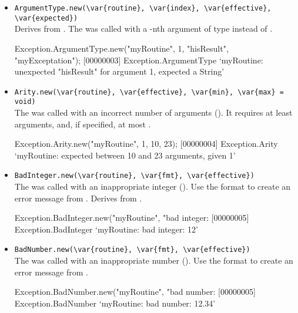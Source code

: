 \begin{itemize}
\item \lstinline|ArgumentType.new(\var{routine}, \var{index}, \var{effective}, \var{expected})|\\
  Derives from .  The  was
  called with a -nth argument of type 
  instead of .
\begin{urbiscript}
Exception.ArgumentType.new("myRoutine", 1, "hisResult", "myExceptation");
[00000003] Exception.ArgumentType `myRoutine: unexpected "hisResult" for argument 1, expected a String'
\end{urbiscript}

\item \lstinline|Arity.new(\var{routine}, \var{effective}, \var{min}, \var{max} = void)|\\
  The  was called with an incorrect number of arguments
  ().  It requires at least  arguments, and,
  if specified, at most .
\begin{urbiscript}
Exception.Arity.new("myRoutine", 1, 10, 23);
[00000004] Exception.Arity `myRoutine: expected between 10 and 23 arguments, given 1'
\end{urbiscript}

\item \lstinline|BadInteger.new(\var{routine}, \var{fmt}, \var{effective})|\\
  The  was called with an inappropriate integer
  ().  Use the format  to create an error
  message from .  Derives from
  .
\begin{urbiscript}
Exception.BadInteger.new("myRoutine", "bad integer: %
[00000005] Exception.BadInteger `myRoutine: bad integer: 12'
\end{urbiscript}

\item \lstinline|BadNumber.new(\var{routine}, \var{fmt}, \var{effective})|\\
  The  was called with an inappropriate number
  ().  Use the format  to create an error
  message from .
\begin{urbiscript}
Exception.BadNumber.new("myRoutine", "bad number: %
[00000005] Exception.BadNumber `myRoutine: bad number: 12.34'
\end{urbiscript}


\end{itemize}
